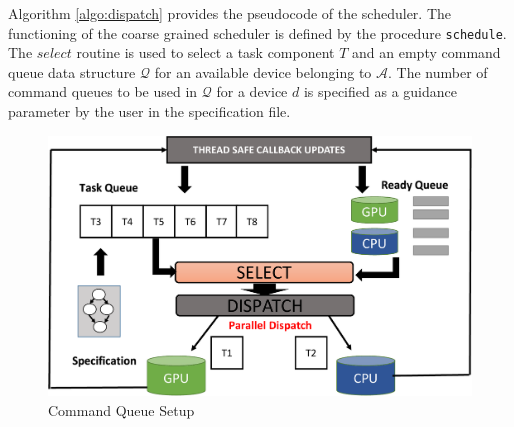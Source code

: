 	 Algorithm \ref{algo:dispatch} provides the pseudocode of the scheduler. The functioning of the coarse grained scheduler is defined by the procedure {\tt schedule}. The $select$ routine is used to select a task component $T$ and an empty command queue data structure $\mathcal{Q}$ for an available device belonging to $\mathcal{A}$. The number of command queues to be used in $\mathcal{Q}$ for a device $d$ is specified as a guidance parameter by the user in the specification file. 
	\begin{figure}[ht]
		\centering
		\includegraphics[scale=0.35]{Pictures/SchedulingEngine.pdf}
		\caption{\small Command Queue Setup\label{fig:schedbackend}}
    \end{figure}
    
